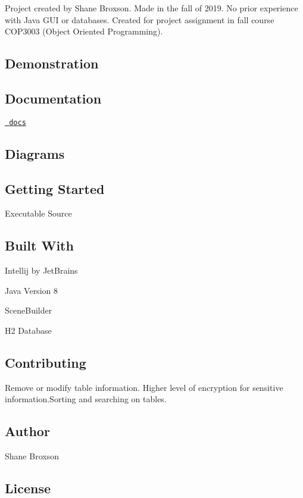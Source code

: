 Project created by Shane Broxson. Made in the fall of 2019. No prior experience with Java G\+UI or databases. Created for project assignment in fall course C\+O\+P3003 (Object Oriented Programming). \subsection*{Demonstration}

 \subsection*{Documentation}

\href{ShaneBroxson.github.io/GUIProgram/docs/index.html}{\texttt{ docs}} \subsection*{Diagrams}

   \subsection*{Getting Started}

Executable Source \subsection*{Built With}


\begin{DoxyItemize}
\item Intellij by Jet\+Brains
\item Java Version 8
\item Scene\+Builder
\item H2 Database \subsection*{Contributing}
\end{DoxyItemize}

Remove or modify table information. Higher level of encryption for sensitive information.\+Sorting and searching on tables. \subsection*{Author}


\begin{DoxyItemize}
\item Shane Broxson \subsection*{License}
\end{DoxyItemize}

